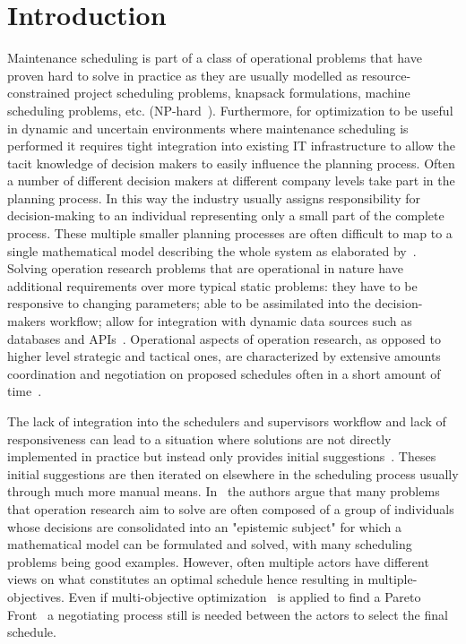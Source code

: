 \section{Introduction}
Maintenance scheduling is part of a class of operational problems that have proven hard to solve in practice as they
are usually modelled as resource-constrained project scheduling problems, knapsack formulations, machine scheduling problems, etc. (NP-hard~\citep{garey1979computers}).
Furthermore, for optimization to be useful in dynamic and uncertain environments where maintenance scheduling
is performed it requires tight integration into existing IT infrastructure to allow the tacit knowledge of decision makers to easily influence
the planning process. Often a number of different decision makers at different company levels take part in the
planning process. In this way the industry usually assigns responsibility for decision-making to an individual
representing only a small part of the complete process. These multiple smaller planning processes are often difficult
to map to a single mathematical model describing the whole system as elaborated by~\citep{barthelemy2002human}. Solving
operation research problems that are operational in nature have additional requirements over more typical static
problems: they have to be responsive to changing parameters; able to be assimilated into the decision-makers workflow;
allow for integration with dynamic data sources such as databases and APIs~\citep{meignan_review_2015}. Operational
aspects of operation research, as opposed to higher level strategic and tactical ones, are characterized by extensive
amounts coordination and negotiation on proposed schedules often in a short amount of time~\citep{palmerMaintenancePlanningScheduling2019}.

The lack of integration into the schedulers and supervisors workflow and lack of responsiveness can lead to a situation
where solutions are not directly implemented in practice but instead only provides initial suggestions~\citep{meignan_review_2015}.
Theses initial suggestions are then iterated on elsewhere in the scheduling process usually through much more manual means.
In~\citep{barthelemy2002human} the authors argue that many problems that operation research aim to solve are often composed
of a group of individuals whose decisions are consolidated into an "epistemic subject" for which a mathematical model can be formulated
and solved, with many scheduling problems being good examples. However, often multiple actors have different
views on what constitutes an optimal schedule hence resulting in multiple-objectives. Even if multi-objective
optimization~\citep{ehrgott2002multiple} is applied to find a Pareto Front~\citep{Pareto1897} a negotiating process
still is needed between the actors to select the final schedule.

